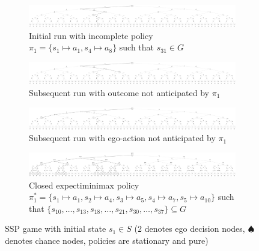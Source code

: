 \documentclass[10pt]{article}
\theoremstyle{plain}
\begin{document}
\begin{landscape}
\begin{figure}[p]
	\footnotesize
    \begin{subfigure}{\linewidth}
        \centering
        \includegraphics[width=\linewidth]{figures/tree-run}
    	\caption{Initial run with incomplete policy $\pi_{1} = \{ s_{1} \mapsto a_{1}, s_{4} \mapsto a_{8} \}$ such that $s_{31} \in G$}
    \end{subfigure}
    \begin{subfigure}{\linewidth}
        \centering
        \includegraphics[width=\linewidth]{figures/tree-run-outcome}
    	\caption{Subsequent run with outcome not anticipated by $\pi_{1}$}
    \end{subfigure}
    \begin{subfigure}{\linewidth}
        \centering
        \includegraphics[width=\linewidth]{figures/tree-run-action}
    	\caption{Subsequent run with ego-action not anticipated by $\pi_{1}$}
    \end{subfigure}
    \begin{subfigure}{\linewidth}
        \centering
        \includegraphics[width=\linewidth]{figures/tree-test}
    	\caption{Closed expectiminimax policy $\pi_{1}^{*} = \{ s_{1} \mapsto a_{1}, s_{2} \mapsto a_{4}, s_{3} \mapsto a_{5}, s_{4} \mapsto a_{7}, s_{5} \mapsto a_{10} \}$ such that $\{ s_{10}, \dots, s_{13}, s_{18}, \dots, s_{21}, s_{30}, \dots, s_{37}  \} \subseteq G$}
    \end{subfigure}
	\caption{SSP game with initial state $s_{1} \in S$ ($2$ denotes ego decision nodes, $\spadesuit$ denotes chance nodes, policies are stationary and pure)}
	\label{figure:game_tree}
\end{figure}
\end{landscape}
\end{document}
